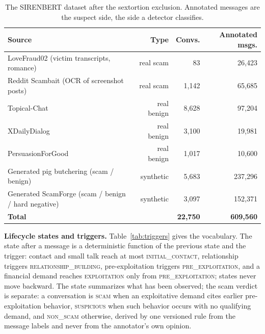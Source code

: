 \documentclass[letterpaper,11pt]{article}
\begin{document}
\begin{table}[h]\centering\footnotesize\setlength{\tabcolsep}{4pt}\begin{tabular}{@{}lrrr@{}}\toprule
Source & Type & Convs. & Annotated msgs. \\\midrule
LoveFraud02 (victim transcripts, romance)~\cite{faber2024lovefraud02} & real scam & 83 & 26,423 \\
Reddit Scambait (OCR of screenshot posts) & real scam & 1,142 & 65,685 \\
Topical-Chat~\cite{gopalakrishnan2019topical} & real benign & 8,628 & 97,204 \\
XDailyDialog~\cite{li2017dailydialog} & real benign & 3,100 & 19,981 \\
PersuasionForGood~\cite{wang2019persuasion} & real benign & 1,017 & 10,600 \\
Generated pig butchering (scam / benign) & synthetic & 5,683 & 237,296 \\
Generated ScamForge (scam / benign / hard negative) & synthetic & 3,097 & 152,371 \\
\midrule \textbf{Total} & & \textbf{22,750} & \textbf{609,560} \\\bottomrule\end{tabular}
\caption{The SIRENBERT dataset after the sextortion exclusion. Annotated messages are the suspect side, the side a detector classifies.}\label{tab:data}\end{table}

\textbf{Lifecycle states and triggers.} Table~\ref{tab:triggers} gives
the vocabulary. The state after a message is a deterministic function of
the previous state and the trigger: contact and small talk reach at most
\textsc{initial\_contact}, relationship triggers
\textsc{relationship\_building}, pre-exploitation triggers
\textsc{pre\_exploitation}, and a financial demand reaches
\textsc{exploitation} only from \textsc{pre\_exploitation}; states
never move backward. The state summarizes what has been observed; the
scam verdict is separate: a conversation is \textsc{scam} when an
exploitative demand cites earlier pre-exploitation behavior,
\textsc{suspicious} when such behavior occurs with no qualifying
demand, and \textsc{non\_scam} otherwise, derived by one versioned rule
from the message labels and never from the annotator's own opinion.
\end{document}
